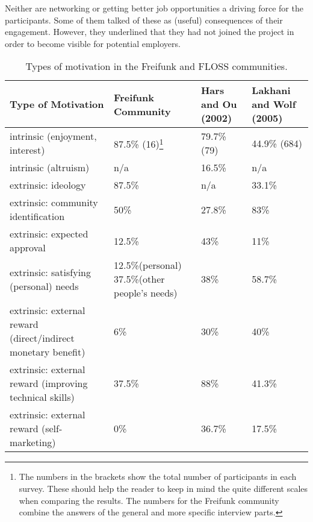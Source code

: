 \documentclass{scrartcl}
\begin{document}
Neither are networking or getting better job opportunities a driving force for the participants.
Some of them talked of these as (useful) consequences of their engagement.
However, they underlined that they had not joined the project in order to become visible for potential employers.

\begin{savenotes}
\begin{table}[h]
  \begin{tabular}{| p{3.5cm} | p{3.5cm} | p{3.5cm} | p{3.5cm} |}
    \hline
    \textbf{Type of Motivation} & \textbf{Freifunk Community} & \textbf{Hars and Ou (2002)} & \textbf{Lakhani and Wolf (2005)}\\
    \hline
    intrinsic (enjoyment, interest) & 87.5\% (16)\footnote{The numbers in the brackets show the total number of participants in each survey. These should help the reader to keep in mind the quite different scales when comparing the results. The numbers for the Freifunk community combine the answers of the general and more specific interview parts.} & 79.7\% (79) & 44.9\% (684) \\
    \hline
    intrinsic (altruism) & n/a & 16.5\% & n/a \\
    \hline
    extrinsic: ideology & 87.5\% & n/a & 33.1\% \\
    \hline
    extrinsic: community identification & 50\% & 27.8\% & 83\% \\
    \hline
    extrinsic: expected approval & 12.5\% & 43\% & 11\% \\
    \hline
    extrinsic: satisfying (personal) needs & 12.5\%(personal) 37.5\%(other people's needs) & 38\% & 58.7\% \\
    \hline
    extrinsic: external reward (direct/indirect monetary benefit)& 6\% & 30\% & 40\% \\
    \hline
    extrinsic: external reward (improving technical skills)& 37.5\% & 88\% & 41.3\% \\
    \hline
    extrinsic: external reward (self-marketing)& 0\% & 36.7\% & 17.5\% \\
    \hline
  \end{tabular}
  \caption{Types of motivation in the Freifunk and FLOSS communities.}
\label{tab:motivation}
\end{table}
\end{savenotes}

\end{document}
